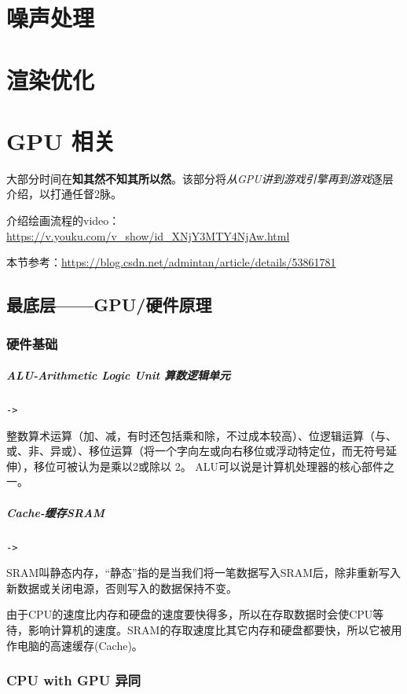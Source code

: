 \documentclass[UTF8,a4paper,12pt]{ctexbook}
\begin{document}
\chapter{噪声处理}



\chapter{渲染优化}

\chapter{GPU 相关}
	大部分时间在\textbf{知其然不知其所以然}。该部分将\textit{从GPU讲到游戏引擎再到游戏}逐层介绍，以打通任督2脉。 

	介绍绘画流程的video：\url{https://v.youku.com/v_show/id_XNjY3MTY4NjAw.html}
	
	本节参考：\url{https://blog.csdn.net/admintan/article/details/53861781}
	\section{最底层——GPU/硬件原理}
		
		\subsection{硬件基础}
			\paragraph{ALU-Arithmetic Logic Unit 算数逻辑单元}\verb|->|
			
				整数算术运算（加、减，有时还包括乘和除，不过成本较高）、位逻辑运算（与、或、非、异或）、移位运算（将一个字向左或向右移位或浮动特定位，而无符号延伸），移位可被认为是乘以2或除以 2。 ALU可以说是计算机处理器的核心部件之一。

			\paragraph{Cache-缓存SRAM}\verb|->|
			
				SRAM叫静态内存，“静态”指的是当我们将一笔数据写入SRAM后，除非重新写入新数据或关闭电源，否则写入的数据保持不变。 
				
				由于CPU的速度比内存和硬盘的速度要快得多，所以在存取数据时会使CPU等待，影响计算机的速度。SRAM的存取速度比其它内存和硬盘都要快，所以它被用作电脑的高速缓存(Cache)。
		\subsection{CPU with GPU 异同}
		
\end{document}
